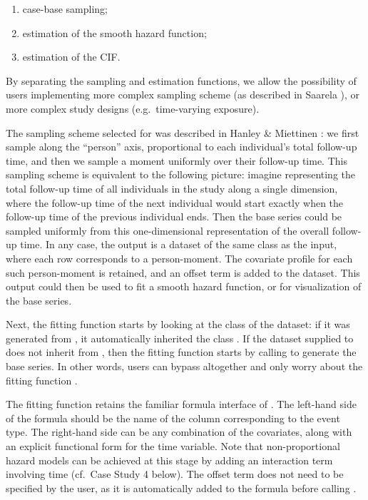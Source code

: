 \documentclass[
]{jss}
\providecommand{\tightlist}{%
  \setlength{\itemsep}{0pt}\setlength{\parskip}{0pt}}
\begin{document}
\begin{enumerate}
\def\labelenumi{\arabic{enumi}.}
\tightlist
\item
  case-base sampling;
\item
  estimation of the smooth hazard function;
\item
  estimation of the CIF.
\end{enumerate}

By separating the sampling and estimation functions, we allow the
possibility of users implementing more complex sampling scheme (as
described in Saarela \citeyearpar{saarela2016case}), or more complex
study designs (e.g.~time-varying exposure).

The sampling scheme selected for  was described in
Hanley \& Miettinen \citeyearpar{hanley2009fitting}: we first sample
along the ``person'' axis, proportional to each individual's total
follow-up time, and then we sample a moment uniformly over their
follow-up time. This sampling scheme is equivalent to the following
picture: imagine representing the total follow-up time of all
individuals in the study along a single dimension, where the follow-up
time of the next individual would start exactly when the follow-up time
of the previous individual ends. Then the base series could be sampled
uniformly from this one-dimensional representation of the overall
follow-up time. In any case, the output is a dataset of the same class
as the input, where each row corresponds to a person-moment. The
covariate profile for each such person-moment is retained, and an offset
term is added to the dataset. This output could then be used to fit a
smooth hazard function, or for visualization of the base series.

Next, the fitting function  starts by looking at
the class of the dataset: if it was generated from
, it automatically inherited the class
. If the dataset supplied to  does
not inherit from , then the fitting function starts by
calling  to generate the base series. In other
words, users can bypass  altogether and only worry
about the fitting function .

The fitting function retains the familiar formula interface of
. The left-hand side of the formula should be the name of the
column corresponding to the event type. The right-hand side can be any
combination of the covariates, along with an explicit functional form
for the time variable. Note that non-proportional hazard models can be
achieved at this stage by adding an interaction term involving time
(cf.~Case Study 4 below). The offset term does not need to be specified
by the user, as it is automatically added to the formula before calling
.
\end{document}
